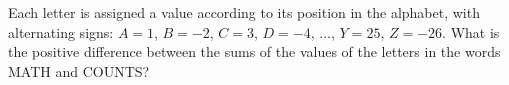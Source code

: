 Each letter is assigned a value according to its position in the alphabet, with alternating signs: $A=1$, $B=-2$, $C=3$, $D=-4$, $\dots$, $Y=25$, $Z=-26$. What is the positive difference between the sums of the values of the letters in the words MATH and COUNTS?
